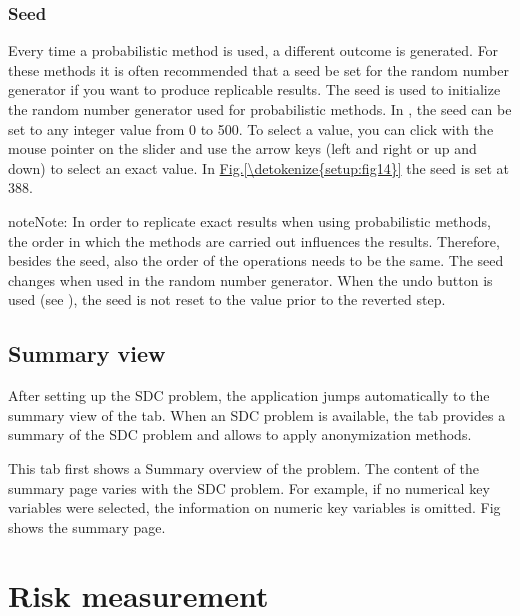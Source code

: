 \documentclass[letterpaper,10pt,english]{sphinxmanual}
\begin{document}
\subsection{Seed}
\label{\detokenize{setup:seed}}
Every time a probabilistic method is used, a different outcome is generated. For these
methods it is often recommended that a seed be set for the random number generator
if you want to produce replicable results. The seed is used to initialize the
random number generator used for probabilistic methods. In , the seed can
be set to any integer value from 0 to 500. To select a value, you can click with
the mouse pointer on the slider and use the arrow keys (left and right or up and down)
to select an exact value. In \hyperref[\detokenize{setup:fig14}]{Fig.\@ \ref{\detokenize{setup:fig14}}} the seed is set at 388.

\begin{sphinxadmonition}{note}{Note:}
In order to replicate exact results when using probabilistic methods, the order in
which the methods are carried out influences the results. Therefore, besides the seed,
also the order of the operations needs to be the same. The seed changes when used in
the random number generator. When the undo button is used (see ), the seed is not
reset to the value prior to the reverted step.
\end{sphinxadmonition}


\section{Summary view}
\label{\detokenize{setup:summary-view}}
After setting up the SDC problem, the application jumps automatically to the summary
view of the  tab. When an SDC problem is available, the  tab
provides a summary of the SDC problem and allows to apply anonymization methods.

This tab first shows a Summary overview of the problem. The content of the summary page varies with
the SDC problem. For example, if no numerical key variables were selected, the information on
numeric key variables is omitted. Fig shows the summary page.


\chapter{Risk measurement}
\label{\detokenize{risk::doc}}\label{\detokenize{risk:risk-measurement}}
\end{document}
